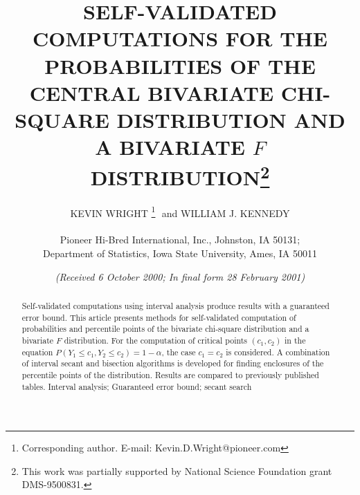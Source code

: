\documentclass[10pt,letterpaper]{article}
\begin{document}



\def\bfw{ {\bf w}}
\def\bfx{{\bf x}}
\def\bfy{{\bf y}}
\def\bfOmega{\mbox{\boldmath $\Omega$}}
\def\bfphi{\mbox{\boldmath $\phi$}}
\def\bfPhi{\mbox{\boldmath $\Phi$}}
\def\bfpi{\mbox{\boldmath $\pi$}}
\def\bfmu{\mbox{\boldmath $\mu$}}
\def\bfPhi{\mbox{\boldmath $\Phi$}}

\renewcommand{\thefootnote}{\arabic{footnote}}

\title{\Large\bf SELF-VALIDATED COMPUTATIONS FOR THE PROBABILITIES OF 
THE CENTRAL BIVARIATE CHI-SQUARE DISTRIBUTION AND A BIVARIATE $F$
DISTRIBUTION\thanks{This work was partially supported by National Science
  Foundation grant DMS-9500831.}}

\author{KEVIN WRIGHT\renewcommand{\thefootnote}{\arabic{footnote}}\footnotemark[1]\renewcommand{\thefootnote}{\fnsymbol{footnote}}
\thanks{Corresponding author.  E-mail: Kevin.D.Wright@pioneer.com}
\,\,and WILLIAM J. KENNEDY\renewcommand{\thefootnote}{\arabic{footnote}}\footnotemark[2]\\
\\
\renewcommand{\thefootnote}{\arabic{footnote}}\footnotemark[1]
\small Pioneer Hi-Bred International, Inc., Johnston, IA 50131; \\
\footnotemark[2] \small Department of Statistics, Iowa State University, Ames, IA 50011}

\date{\it\small (Received 6 October 2000; In final form 28 February 2001) }
\maketitle

\renewcommand{\thefootnote}{\fnsymbol{footnote}}

\begin{abstract}
\noindent Self-validated computations using interval 
analysis produce results with a
guaranteed error bound.  This article presents methods for self-validated
computation of probabilities and percentile points of the bivariate chi-square
distribution and a bivariate $F$ distribution.  For the computation of
critical points $(c_1, c_2)$ in the equation
$P(Y_1 \leq c_1, Y_2 \leq c_2) = 1-\alpha$,
the case $c_1 = c_2$ is considered.  A combination of interval secant
and bisection algorithms is developed for finding enclosures of the percentile
points of the distribution.  Results are compared to previously published
tables. 
\newline
\newline
{} Interval analysis; 
Guaranteed error bound; secant search
\end{abstract}
\end{document}
